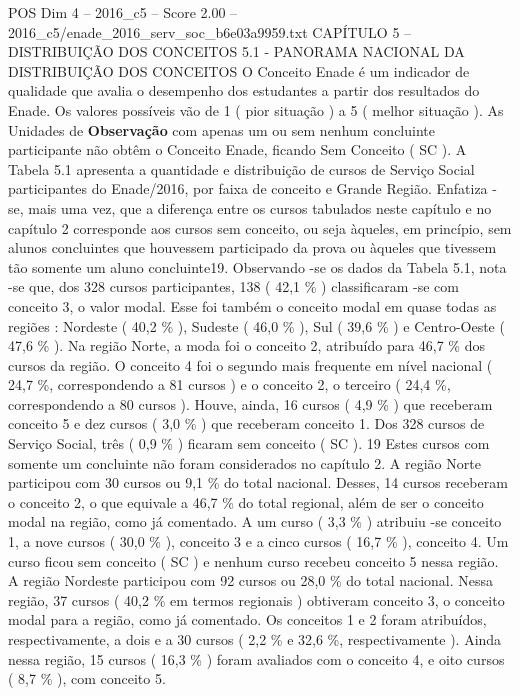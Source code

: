 \begin{textsample}{POS Dim 4 – 2016\_c5 – Score 2.00 – 2016\_c5/enade\_2016\_serv\_soc\_b6e03a9959.txt}  \label{ex:f4_pos_108}
CAPÍTULO 5 – DISTRIBUIÇÃO DOS CONCEITOS 5.1 - PANORAMA NACIONAL DA DISTRIBUIÇÃO DOS CONCEITOS O Conceito Enade é um indicador de qualidade que avalia o desempenho dos estudantes a partir dos resultados do Enade.
Os valores possíveis vão de 1 ( pior situação ) a 5 ( melhor situação ).
As Unidades de \textbf{Observação} com apenas um ou sem nenhum concluinte participante não obtêm o Conceito Enade, ficando Sem Conceito ( SC ).
A Tabela 5.1 apresenta a quantidade e distribuição de cursos de Serviço Social participantes do Enade/2016, por faixa de conceito e Grande Região.
Enfatiza -se, mais uma vez, que a diferença entre os cursos tabulados neste capítulo e no capítulo 2 corresponde aos cursos sem conceito, ou seja àqueles, em princípio, sem alunos concluintes que houvessem participado da prova ou àqueles que tivessem tão somente um aluno concluinte19.
Observando -se os dados da Tabela 5.1, nota -se que, dos 328 cursos participantes, 138 ( 42,1 \% ) classificaram -se com conceito 3, o valor modal.
Esse foi também o conceito modal em quase todas as regiões : Nordeste ( 40,2 \% ), Sudeste ( 46,0 \% ), Sul ( 39,6 \% ) e Centro-Oeste ( 47,6 \% ).
Na região Norte, a moda foi o conceito 2, atribuído para 46,7 \% dos cursos da região.
O conceito 4 foi o segundo mais frequente em nível nacional ( 24,7 \%, correspondendo a 81 cursos ) e o conceito 2, o terceiro ( 24,4 \%, correspondendo a 80 cursos ).
Houve, ainda, 16 cursos ( 4,9 \% ) que receberam conceito 5 e dez cursos ( 3,0 \% ) que receberam conceito 1.
Dos 328 cursos de Serviço Social, três ( 0,9 \% ) ficaram sem conceito ( SC ). 19 Estes cursos com somente um concluinte não foram considerados no capítulo 2.
A região Norte participou com 30 cursos ou 9,1 \% do total nacional.
Desses, 14 cursos receberam o conceito 2, o que equivale a 46,7 \% do total regional, além de ser o conceito modal na região, como já comentado.
A um curso ( 3,3 \% ) atribuiu -se conceito 1, a nove cursos ( 30,0 \% ), conceito 3 e a cinco cursos ( 16,7 \% ), conceito 4.
Um curso ficou sem conceito ( SC ) e nenhum curso recebeu conceito 5 nessa região.
A região Nordeste participou com 92 cursos ou 28,0 \% do total nacional.
Nessa região, 37 cursos ( 40,2 \% em termos regionais ) obtiveram conceito 3, o conceito modal para a região, como já comentado.
Os conceitos 1 e 2 foram atribuídos, respectivamente, a dois e a 30 cursos ( 2,2 \% e 32,6 \%, respectivamente ).
Ainda nessa região, 15 cursos ( 16,3 \% ) foram avaliados com o conceito 4, e oito cursos ( 8,7 \% ), com conceito 5.

\end{textsample}
